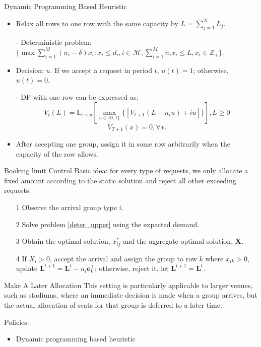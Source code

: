       \begin{frame}{Dynamic Programming Based Heuristic}
        \begin{itemize}
        \item Relax all rows to one row with the same capacity by $L = \sum_{j=1}^{N} L_j$.
        \item[-] Deterministic problem: $\{\max \sum_{i=1}^{M} (n_i- \delta) x_{i}: x_{i} \leq d_{i}, i \in \mathcal{M}, \sum_{i=1}^{M} n_{i} x_{i} \leq L, x_{i} \in \mathbb{Z}_{+}\}$.
        \item Decision: $u$. If we accept a request in period $t$, $u(t) = 1$; otherwise, $u(t) =0$.  
        \item[-] DP with one row can be expressed as:
        $$V_{t}(L) = \mathbb{E}_{i \sim p} [\max_{u \in \{0,1\}} \{ {[V_{t+1}(L-n_i u)+ i u]}\}], L \geq 0$$ 
        $$V_{T+1}(x) =0, \forall x.$$
        \item After accepting one group, assign it in some row arbitrarily when the capacity of the row allows.
        \end{itemize}
      \end{frame}
      
      \begin{frame}{Booking limit Control}
        Basic idea: for every type of requests, we only allocate a fixed amount according to the static solution and reject all other exceeding requests.
        \begin{itemize}
          \item[1] Observe the arrival group type $i$.
          \item[2] Solve problem \eqref{deter_upper} using the expected demand.
          \item[3] Obtain the optimal solution, $x_{ij}^{*}$ and the aggregate optimal solution, $\mathbf{X}$.
          \item[4] If $X_{i} > 0$, accept the arrival and assign the group to row $k$ where $x_{ik} > 0$, update $\mathbf{L}^{t+1} = \mathbf{L}^{t} - n_i \mathbf{e}_{k}^{\top}$; otherwise, reject it, let $\mathbf{L}^{t+1} = \mathbf{L}^{t}$.
        \end{itemize}
                 
      \end{frame}

      \begin{frame}{Make A Later Allocation}
          This setting is particularly applicable to larger venues, such as stadiums, where an immediate decision is made when a group arrives, but the actual allocation of seats for that group is deferred to a later time.

          Policies:

          \begin{itemize}
            \item Dynamic programming based heuristic
          \end{itemize}

      \end{frame}